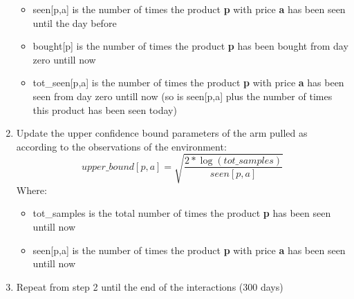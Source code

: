 \begin{enumerate}
\begin{itemize}
            \item seen[p,a] is the number of times the product {\bf p} with price {\bf a} has been seen until the day before
            \item bought[p] is the number of times the product {\bf p} has been bought from day zero untill now
            \item tot\_seen[p,a] is the number of times the product {\bf p} with price {\bf a} has been seen from day zero untill now (so is seen[p,a] plus the number of times this product has been seen today)
        \end{itemize}
    \item Update the upper confidence bound parameters of the arm pulled as according to the observations of the environment:
        \begin{equation}
            upper\_bound[p,a] = \sqrt{\frac{2 * \log (tot\_samples)}{seen[p,a]}}
        \end{equation}Where:
        \begin{itemize}
            \item tot\_samples is the total number of times the product {\bf p} has been seen untill now
            \item seen[p,a] is the number of times the product {\bf p} with price {\bf a} has been seen  untill now
        \end{itemize}
    \item Repeat from step 2 until the end of the interactions (300 days)
\end{enumerate}
